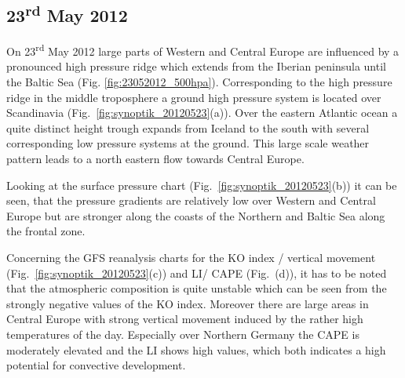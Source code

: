 \subsection{23\textsuperscript{rd} May 2012}
On 23\textsuperscript{rd} May 2012 large parts of Western and Central Europe are influenced by a pronounced high pressure ridge which extends from the Iberian peninsula until the Baltic Sea (Fig. \ref{fig:23052012_500hpa}). Corresponding to the high pressure ridge in the middle troposphere a ground high pressure system is located over Scandinavia (Fig.~\ref{fig:synoptik_20120523}(a)). Over the eastern Atlantic ocean a quite distinct height trough expands from Iceland to the south with several corresponding low pressure systems at the ground. This large scale weather pattern leads to a north eastern flow towards Central Europe. 

Looking at the surface pressure chart (Fig.~\ref{fig:synoptik_20120523}(b)) it can be seen, that the pressure gradients are relatively low over Western and Central Europe but are stronger along the coasts of the Northern and Baltic Sea along the frontal zone. 

Concerning the GFS reanalysis charts for the KO index / vertical movement (Fig.~\ref{fig:synoptik_20120523}(c)) and LI/ CAPE (Fig.~(d)), it has to be noted that the atmospheric composition is quite unstable which can be seen from the strongly negative values of the KO index. Moreover there are large areas in Central Europe with strong vertical movement induced by the rather high temperatures of the day. Especially over Northern Germany the CAPE is moderately elevated and the LI shows high values, which both indicates a high potential for convective development.

